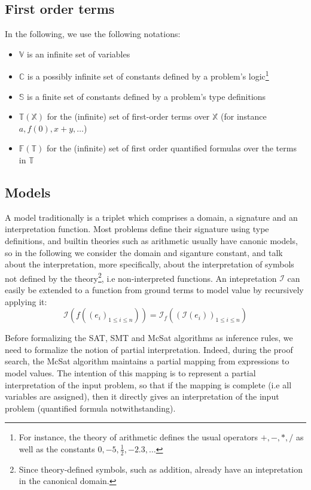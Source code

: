 \subsection{First order terms}

In the following, we use the following notations:
\begin{itemize}
  \item $\mathbb{V}$ is an infinite set of variables
  \item $\mathbb{C}$ is a possibly infinite set of constants defined
    by a problem's logic\footnote{For instance, the theory of arithmetic
    defines the usual operators $+, -, *, /$ as well as the constants
    $0, -5, \frac{1}{2}, -2.3, \ldots$}
  \item $\mathbb{S}$ is a finite set of constants defined by a problem's type definitions
  \item $\mathbb{T}(\mathbb{X})$ for the (infinite) set of first-order terms over $\mathbb{X}$
    (for instance $a, f(0), x + y, \ldots$)
  \item $\mathbb{F}(\mathbb{T})$ for the (infinite) set of first order quantified formulas
    over the terms in $\mathbb{T}$
\end{itemize}

\subsection{Models}

A model traditionally is a triplet which comprises a domain, a signature and an interpretation function.
Most problems define their signature using type definitions, and builtin theories such as arithmetic
usually have canonic models, so in the following we consider the domain and siganture constant, and
talk about the interpretation, more specifically, about the interpretation of symbols not defined
by the theory\footnote{Since theory-defined symbols, such as addition, already have an intepretation
in the canonical domain.}, i.e non-interpreted functions. An intepretation $\mathcal{I}$ can easily
be extended to a function from ground terms to model value by recursively applying it:
\[
  \mathcal{I}( f ( {(e_i)}_{1\leq i \leq n})) = \mathcal{I}_f ( {( \mathcal{I}(e_i) )}_{1 \leq i \leq n} )
\]

Before formalizing the SAT, SMT and McSat algorithms as inference rules, we need to formalize the notion
of partial interpretation. Indeed, during the proof search, the McSat algorithm maintains a partial mapping from
expressions to model values. The intention of this mapping is to represent a partial interpretation of the input
problem, so that if the mapping is complete (i.e all variables are assigned), then it directly gives an interpretation
of the input problem (quantified formula notwithstanding).

